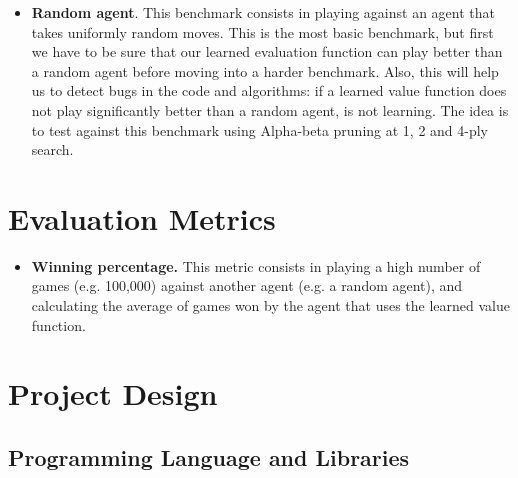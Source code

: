 \documentclass{article}
\begin{document}
\begin{itemize}

    \item \textbf{Random agent}. This benchmark consists in playing against an agent that takes
        uniformly random moves. This is the most basic benchmark, but first we have to be sure that
        our learned evaluation function can play better than a random agent before moving into a
        harder benchmark. Also, this will help us to detect bugs in the code and algorithms: if a
        learned value function does not play significantly better than a random agent, is not
        learning. The idea is to test against this benchmark using Alpha-beta pruning at 1, 2 and
        4-ply search.

\end{itemize}

\section{Evaluation Metrics}

\begin{itemize}

    \item \textbf{Winning percentage.} This metric consists in playing a high number of games (e.g.
        100,000) against another agent (e.g. a random agent), and calculating the average of games
        won by the agent that uses the learned value function.

\end{itemize}

\section{Project Design}
\label{sec:project-design}

\subsection{Programming Language and Libraries}
\end{document}
